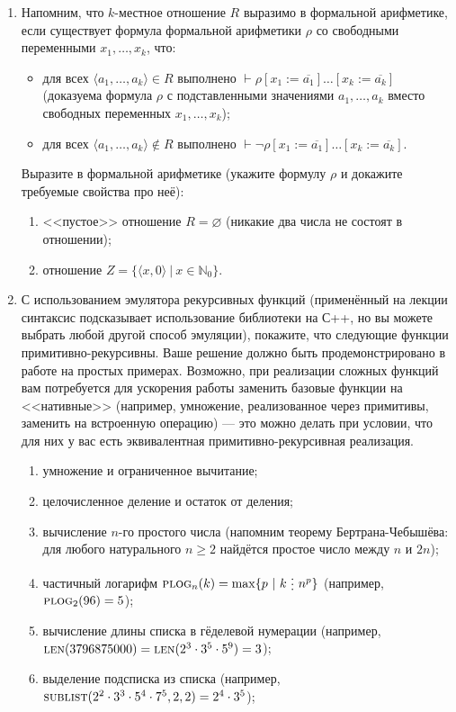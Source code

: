 \documentclass[10pt,a4paper,oneside]{article}
\begin{document}
\begin{enumerate}
\item Напомним, что $k$-местное отношение $R$ выразимо в формальной арифметике,
если существует формула формальной арифметики $\rho$ со свободными переменными $x_1, \dots, x_k$, что:
\begin{itemize}
\item для всех $\langle a_1, \dots, a_k \rangle \in R$ выполнено $\vdash\rho[x_1 := \overline{a_1}]\dots[x_k := \overline{a_k}]$
(доказуема формула $\rho$ с подставленными значениями $a_1, \dots, a_k$ вместо свободных переменных $x_1, \dots, x_k$);
\item для всех $\langle a_1, \dots, a_k \rangle \notin R$ выполнено $\vdash\neg\rho[x_1 := \overline{a_1}]\dots[x_k := \overline{a_k}]$.
\end{itemize}

Выразите в формальной арифметике (укажите формулу $\rho$ и докажите требуемые свойства про неё):
\begin{enumerate}
\item <<пустое>> отношение $R = \varnothing$ (никакие два числа не состоят в отношении);
\item отношение $Z = \{ \langle x, 0 \rangle\ |\ x \in \mathbb{N}_0\}$.
\end{enumerate}

\item С использованием эмулятора рекурсивных функций (применённый на лекции синтаксис
подсказывает использование библиотеки на С++, но вы можете выбрать любой другой способ эмуляции),
покажите, что следующие функции примитивно-рекурсивны. Ваше решение должно быть продемонстрировано
в работе на простых примерах. Возможно, при реализации сложных функций вам потребуется 
для ускорения работы заменить базовые функции на <<нативные>> (например, умножение, реализованное
через примитивы, заменить на встроенную операцию) --- это можно делать при условии, что 
для них у вас есть эквивалентная примитивно-рекурсивная реализация.
\begin{enumerate}
\item умножение и ограниченное вычитание;
\item целочисленное деление и остаток от деления;
\item вычисление $n$-го простого числа (напомним теорему Бертрана-Чебышёва: для любого натурального $n \ge 2$ найдётся
простое число между $n$ и $2n$);
\item частичный логарифм $\textsc{plog}_n(k) = \max\{p\ |\ k\ \raisebox{-0.5ex}{\vdots}\ n^p\}$ (например, $\textsc{plog}_2(96)=5$);
\item вычисление длины списка в гёделевой нумерации (например, $\textsc{len}(3796875000) = \textsc{len}(2^3\cdot 3^5\cdot 5^9) = 3$);
\item выделение подсписка из списка (например, $\textsc{sublist}(2^2 \cdot 3^3 \cdot 5^4 \cdot 7^5, 2, 2) = 2^4 \cdot 3^5$);
\end{enumerate}


\end{enumerate}
\end{document}
